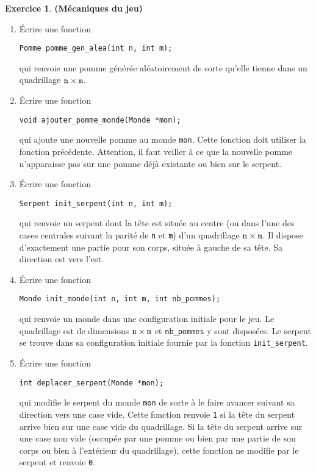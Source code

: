 \documentclass[12pt]{article}
\theoremstyle{definition}
\newtheorem{Exercice}{Exercice}
\begin{document}
\begin{Exercice} {\bf (Mécaniques du jeu)}\smallskip
\begin{enumerate}
    \item Écrire une fonction
\begin{lstlisting}
Pomme pomme_gen_alea(int n, int m);
\end{lstlisting}
    qui renvoie une pomme générée aléatoirement de sorte qu'elle tienne
    dans un quadrillage ${\tt n} \times {\tt m}$.
    \smallskip

    \item Écrire une fonction
\begin{lstlisting}
void ajouter_pomme_monde(Monde *mon);
\end{lstlisting}
    qui ajoute une nouvelle pomme au monde {\tt mon}. Cette fonction
    doit utiliser la fonction précédente. Attention, il faut veiller
    à ce que la nouvelle pomme n'apparaisse pas sur une pomme déjà
    existante ou bien sur le serpent.
    \smallskip

    \item Écrire une fonction
\begin{lstlisting}
Serpent init_serpent(int n, int m);
\end{lstlisting}
    qui renvoie un serpent dont la tête est située au centre (ou dans
    l'une des cases centrales suivant la parité de {\tt n} et {\tt m})
    d'un quadrillage ${\tt n} \times {\tt m}$. Il dispose d'exactement
    une partie pour son corps, située à gauche de sa tête. Sa direction
    est vers l'est.
    \smallskip

    \item Écrire une fonction
\begin{lstlisting}
Monde init_monde(int n, int m, int nb_pommes);
\end{lstlisting}
    qui renvoie un monde dans une configuration initiale pour le jeu.
    Le quadrillage est de dimensions ${\tt n} \times {\tt m}$ et
    {\tt nb\_pommes} y sont disposées. Le serpent se trouve dans
    sa configuration initiale fournie par la fonction {\tt init\_serpent}.
    \smallskip

    \item Écrire une fonction
\begin{lstlisting}
int deplacer_serpent(Monde *mon);
\end{lstlisting}
    qui modifie le serpent du monde {\tt mon} de sorte à le faire avancer
    suivant sa direction vers une case vide. Cette fonction renvoie {\tt 1}
    si la tête du serpent arrive bien sur une case vide du quadrillage.
    Si la tête du serpent arrive sur une case non vide (occupée par une
    pomme ou bien par une partie de son corps ou bien à l'extérieur du
    quadrillage), cette fonction ne modifie par le serpent et renvoie {\tt 0}.
    \smallskip


\end{enumerate}
\end{Exercice}
\end{document}
